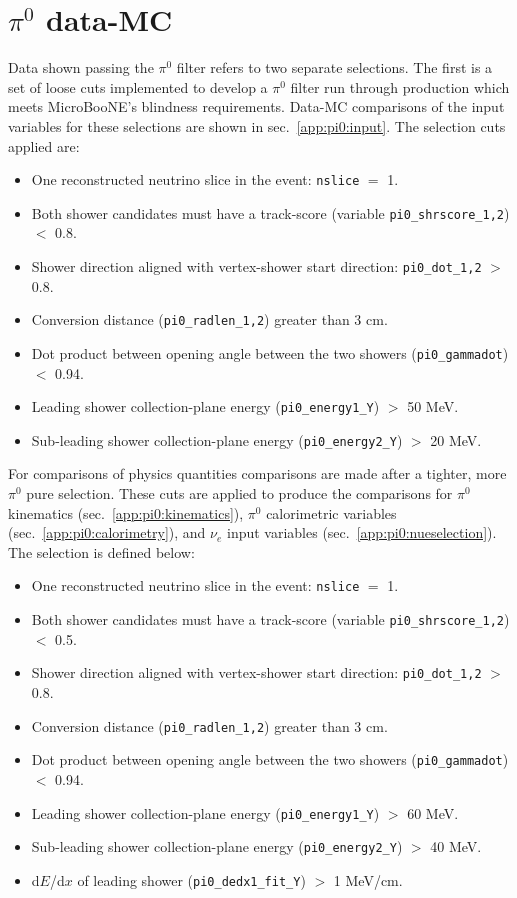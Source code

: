 \section{$\pi^0$ data-MC}
\label{app:pi0}
\par Data shown passing the $\pi^0$ filter refers to two separate selections. The first is a set of loose cuts implemented to develop a $\pi^0$ filter run through production which meets MicroBooNE's blindness requirements. Data-MC comparisons of the input variables for these selections are shown in sec.~\ref{app:pi0:input}. The selection cuts applied are:
\begin{itemize}
    \item One reconstructed neutrino slice in the event: \texttt{nslice} $=$ 1.
    \item Both shower candidates must have a track-score (variable \texttt{pi0\_shrscore\_1,2}) $<$ 0.8.
    \item Shower direction aligned with vertex-shower start direction: \texttt{pi0\_dot\_1,2} $>$ 0.8.
    \item Conversion distance (\texttt{pi0\_radlen\_1,2}) greater than 3 cm.
    \item Dot product between opening angle between the two showers (\texttt{pi0\_gammadot}) $<$ 0.94.
    \item Leading shower collection-plane energy (\texttt{pi0\_energy1\_Y}) $>$ 50 MeV.
    \item Sub-leading shower collection-plane energy (\texttt{pi0\_energy2\_Y}) $>$ 20 MeV.
\end{itemize}
For comparisons of physics quantities comparisons are made after a tighter, more $\pi^0$ pure selection. These cuts are applied to produce the comparisons for $\pi^0$ kinematics (sec.~\ref{app:pi0:kinematics}), $\pi^0$ calorimetric variables (sec.~\ref{app:pi0:calorimetry}), and $\nu_e$ input variables (sec.~\ref{app:pi0:nueselection}). The selection is defined below:
\begin{itemize}
    \item One reconstructed neutrino slice in the event: \texttt{nslice} $=$ 1.
    \item Both shower candidates must have a track-score (variable \texttt{pi0\_shrscore\_1,2}) $<$ 0.5.
    \item Shower direction aligned with vertex-shower start direction: \texttt{pi0\_dot\_1,2} $>$ 0.8.
    \item Conversion distance (\texttt{pi0\_radlen\_1,2}) greater than 3 cm.
    \item Dot product between opening angle between the two showers (\texttt{pi0\_gammadot}) $<$ 0.94.
    \item Leading shower collection-plane energy (\texttt{pi0\_energy1\_Y}) $>$ 60 MeV.
    \item Sub-leading shower collection-plane energy (\texttt{pi0\_energy2\_Y}) $>$ 40 MeV.
    \item d$E$/d$x$  of leading shower (\texttt{pi0\_dedx1\_fit\_Y}) $>$ 1 MeV/cm.
\end{itemize}

